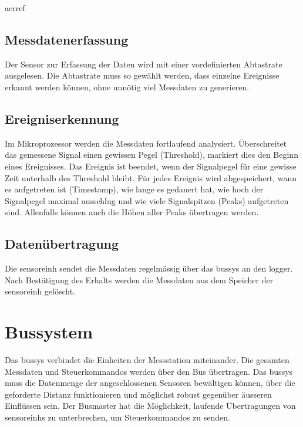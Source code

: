\gls{acrref}
\subsection{Messdatenerfassung}
Der Sensor zur Erfassung der Daten wird mit einer vordefinierten Abtastrate ausgelesen. Die Abtastrate muss so gewählt werden, dass einzelne Ereignisse erkannt werden können, ohne unnötig viel Messdaten zu generieren.

\subsection{Ereigniserkennung}
Im Mikroprozessor werden die Messdaten fortlaufend analysiert. Überschreitet das gemessene Signal einen gewissen Pegel (Threshold), markiert dies den Beginn eines Ereignisses. Das Ereignis ist beendet, wenn der Signalpegel für eine gewisse Zeit unterhalb des Threshold bleibt. Für jedes Ereignis wird abgespeichert, wann es aufgetreten ist (Timestamp), wie lange es gedauert hat, wie hoch der Signalpegel maximal ausschlug und wie viele Signalspitzen (Peaks) aufgetreten sind. Allenfalls können auch die Höhen aller Peaks übertragen werden.

\subsection{Datenübertragung}
Die \gls{sensoreinh} sendet die Messdaten regelmässig über das \gls{bussys} an den \gls{logger}. Nach Bestätigung des Erhalts werden die Messdaten aus dem Speicher der \gls{sensoreinh} gelöscht.

\section{Bussystem}
Das \gls{bussys} verbindet die Einheiten der Messstation miteinander. Die gesamten Messdaten und Steuerkommandos werden über den Bus übertragen. Das \gls{bussys} muss die Datenmenge der angeschlossenen Sensoren bewältigen können, über die geforderte Distanz funktionieren und möglichst robust gegenüber äusseren Einflüssen sein. Der Busmaster hat die Möglichkeit, laufende Übertragungen von \glspl{sensoreinh} zu unterbrechen, um Steuerkommandos zu senden.